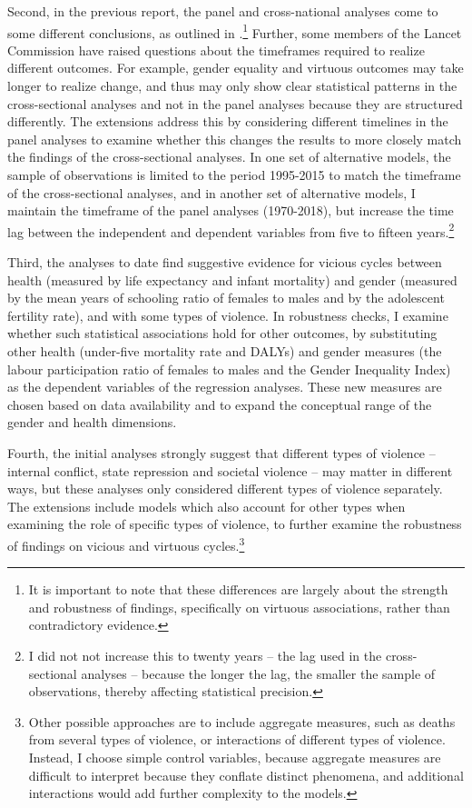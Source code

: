 \documentclass[12pt]{article}
\begin{document}
Second, in the previous report, the panel and cross-national analyses come to some different conclusions, as outlined in .\footnote{It is important to note that these differences are largely about the strength and robustness of findings, specifically on virtuous associations, rather than contradictory evidence.}
Further, some members of the Lancet Commission have raised questions about the timeframes required to realize different outcomes. For example, gender equality and virtuous outcomes may take longer to realize change, and thus may only show clear statistical patterns in the cross-sectional analyses and not in the panel analyses because they are structured differently. The extensions address this by considering different timelines in the panel analyses to examine whether this changes the results to more closely match the findings of the cross-sectional analyses. In one set of alternative models, the sample of observations is limited to the period 1995-2015 to match the timeframe of the cross-sectional analyses, and in another set of alternative models, I maintain the timeframe of the panel analyses (1970-2018), but increase the time lag between the independent and dependent variables from five to fifteen years.\footnote{I did not not increase this to twenty years -- the lag used in the cross-sectional analyses -- because the longer the lag, the smaller the sample of observations, thereby affecting statistical precision.}

Third, the analyses to date find suggestive evidence for vicious cycles between health (measured by life expectancy and infant mortality) and gender (measured by the mean years of schooling ratio of females to males and by the adolescent fertility rate), and with some types of violence. In robustness checks, I examine whether such statistical associations hold for other outcomes, by substituting other health (under-five mortality rate and DALYs) and gender measures (the labour participation ratio of females to males and the Gender Inequality Index) as the dependent variables of the regression analyses. These new measures are chosen based on data availability and to expand the conceptual range of the gender and health dimensions.

Fourth, the initial analyses strongly suggest that different types of violence -- internal conflict, state repression and societal violence -- may matter in different ways, but these analyses only considered different types of violence separately. The extensions include models which also account for other types when examining the role of specific types of violence, to further examine the robustness of findings on vicious and virtuous cycles.\footnote{Other possible approaches are to include aggregate measures, such as deaths from several types of violence, or interactions of different types of violence. Instead,  I choose simple control variables, because aggregate measures are difficult to interpret because they conflate distinct phenomena, and additional interactions would add further complexity to the models.}
\end{document}
